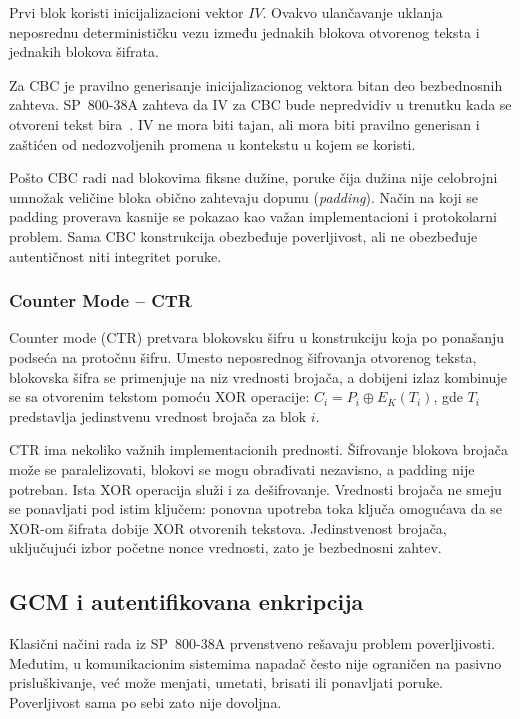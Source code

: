 Prvi blok koristi inicijalizacioni vektor $IV$.
Ovakvo ulančavanje uklanja neposrednu determinističku vezu između
jednakih blokova otvorenog teksta i jednakih blokova šifrata.

Za CBC je pravilno generisanje inicijalizacionog vektora bitan deo
bezbednosnih zahteva. SP~800-38A zahteva da IV za CBC bude nepredvidiv
u trenutku kada se otvoreni tekst bira~\cite{sp800-38a}.
IV ne mora biti tajan, ali mora biti pravilno generisan i zaštićen od
nedozvoljenih promena u kontekstu u kojem se koristi.

Pošto CBC radi nad blokovima fiksne dužine, poruke čija dužina nije
celobrojni umnožak veličine bloka obično zahtevaju dopunu
(\emph{padding}). Način na koji se padding proverava kasnije se pokazao
kao važan implementacioni i protokolarni problem. Sama CBC konstrukcija
obezbeđuje poverljivost, ali ne obezbeđuje autentičnost niti integritet
poruke.


\subsubsection{Counter Mode -- CTR}

Counter mode (CTR) pretvara blokovsku šifru u konstrukciju koja po
ponašanju podseća na protočnu šifru. Umesto neposrednog šifrovanja
otvorenog teksta, blokovska šifra se primenjuje na niz vrednosti
brojača, a dobijeni izlaz kombinuje se sa otvorenim tekstom pomoću XOR
operacije:
$C_i = P_i \oplus E_K(T_i)$,
gde $T_i$ predstavlja jedinstvenu vrednost brojača za blok $i$.

CTR ima nekoliko važnih implementacionih prednosti. Šifrovanje blokova
brojača može se paralelizovati, blokovi se mogu obrađivati nezavisno, a
padding nije potreban. Ista XOR operacija služi i za dešifrovanje. Vrednosti brojača ne smeju
se ponavljati pod istim ključem: ponovna upotreba toka ključa omogućava
da se XOR-om šifrata dobije XOR otvorenih tekstova. Jedinstvenost
brojača, uključujući izbor početne nonce vrednosti, zato je bezbednosni
zahtev.

\subsection{GCM i autentifikovana enkripcija}
\label{subsec:gcm_aead}

Klasični načini rada iz SP~800-38A prvenstveno rešavaju problem
poverljivosti. Međutim, u komunikacionim sistemima napadač često nije
ograničen na pasivno prisluškivanje, već može menjati, umetati, brisati
ili ponavljati poruke. Poverljivost sama po sebi zato nije dovoljna.

